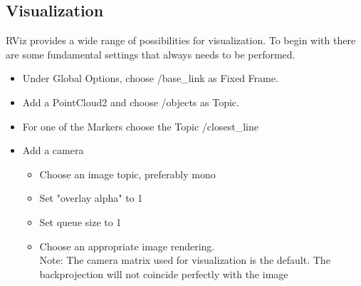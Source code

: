 \documentclass[10pt,a4paper]{article}
\begin{document}
\subsection{Visualization}
RViz provides a wide range of possibilities for visualization.
To begin with there are some fundamental settings that always needs to be performed.
\begin{itemize}

\item Under Global Options, choose /base\_link as Fixed Frame.

\item Add a PointCloud2 and choose /objects as Topic.

\item For one of the Markers choose the Topic /closest\_line

\item Add a camera
\begin{itemize}
\item Choose an image topic, preferably mono 
\item Set "overlay alpha" to 1
\item Set queue size to 1
\item Choose an appropriate image rendering.\\
Note: The camera matrix used for visualization is the default. The backprojection will not coincide perfectly with the image
\end{itemize} 
\end{itemize}
\end{document}
